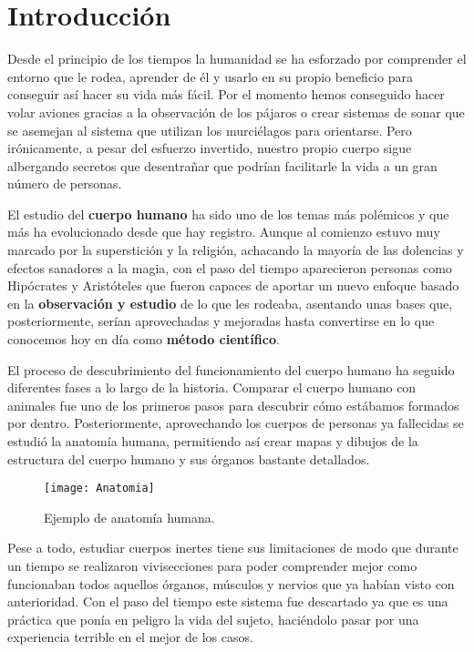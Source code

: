 \chapter{Introducción\label{sec:introduccion}}

Desde el principio de los tiempos la humanidad se ha esforzado por comprender el entorno que le rodea, aprender de él y usarlo en su propio beneficio para conseguir así hacer su vida más fácil. Por el momento hemos conseguido hacer volar aviones gracias a la observación de los pájaros o crear sistemas de sonar que se asemejan al sistema que utilizan los murciélagos para orientarse. Pero irónicamente, a pesar del esfuerzo invertido, nuestro propio cuerpo sigue albergando secretos que desentrañar que podrían facilitarle la vida a un gran número de personas.

El estudio del \textbf{cuerpo humano} ha sido uno de los temas más polémicos y que más ha evolucionado desde que hay registro. Aunque al comienzo estuvo muy marcado por la superstición y la religión, achacando la mayoría de las dolencias y efectos sanadores a la magia, con el paso del tiempo aparecieron personas como Hipócrates y Aristóteles que fueron capaces de aportar un nuevo enfoque basado en la \textbf{observación y estudio} de lo que les rodeaba, asentando unas bases que, posteriormente, serían aprovechadas y mejoradas hasta convertirse en lo que conocemos hoy en día como \textbf{método científico}.

El proceso de descubrimiento del funcionamiento del cuerpo humano ha seguido diferentes fases a lo largo de la historia. Comparar el cuerpo humano con animales fue uno de los primeros pasos para descubrir cómo estábamos formados por dentro. Posteriormente, aprovechando los cuerpos de personas ya fallecidas se estudió la anatomía humana, permitiendo así crear mapas y dibujos de la estructura del cuerpo humano y sus órganos bastante detallados.

\begin{figure} [H]
    \centering
    \texttt{[image: Anatomia]}
    \caption{Ejemplo de anatomía humana.}
    \label{fig:Anatomia}
\end{figure}

Pese a todo, estudiar cuerpos inertes tiene sus limitaciones de modo que durante un tiempo se realizaron vivisecciones para poder comprender mejor como funcionaban todos aquellos órganos, músculos y nervios que ya habían visto con anterioridad. Con el paso del tiempo este sistema fue descartado ya que es una práctica que ponía en peligro la vida del sujeto, haciéndolo pasar por una experiencia terrible en el mejor de los casos.

